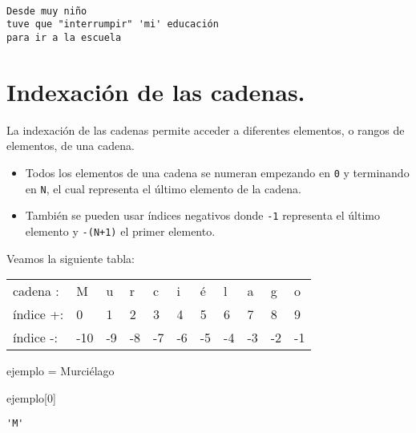 \documentclass[
  letterpaper,
  DIV=11,
  numbers=noendperiod]{scrreprt}
\newenvironment{Shaded}{\begin{snugshade}}{\end{snugshade}}
\newcommand{\DecValTok}[1]{\textcolor[rgb]{0.68,0.00,0.00}{#1}}
\newcommand{\NormalTok}[1]{\textcolor[rgb]{0.00,0.23,0.31}{#1}}
\newcommand{\OperatorTok}[1]{\textcolor[rgb]{0.37,0.37,0.37}{#1}}
\newcommand{\StringTok}[1]{\textcolor[rgb]{0.13,0.47,0.30}{#1}}
\providecommand{\tightlist}{%
  \setlength{\itemsep}{0pt}\setlength{\parskip}{0pt}}\usepackage{longtable,booktabs,array}
\begin{document}
\begin{verbatim}

Desde muy niño
tuve que "interrumpir" 'mi' educación
para ir a la escuela
\end{verbatim}

\section{Indexación de las
cadenas.}\label{indexaciuxf3n-de-las-cadenas.}

La indexación de las cadenas permite acceder a diferentes elementos, o
rangos de elementos, de una cadena.

\begin{itemize}
\tightlist
\item
  Todos los elementos de una cadena se numeran empezando en \texttt{0} y
  terminando en \texttt{N}, el cual representa el último elemento de la
  cadena.
\item
  También se pueden usar índices negativos donde \texttt{-1} representa
  el último elemento y \texttt{-(N+1)} el primer elemento.
\end{itemize}

Veamos la siguiente tabla:

\begin{longtable}[]{@{}lllllllllll@{}}
\toprule\noalign{}
\endhead
\bottomrule\noalign{}
\endlastfoot
cadena : & M & u & r & c & i & é & l & a & g & o \\
índice +: & 0 & 1 & 2 & 3 & 4 & 5 & 6 & 7 & 8 & 9 \\
índice -: & -10 & -9 & -8 & -7 & -6 & -5 & -4 & -3 & -2 & -1 \\
\end{longtable}

\begin{Shaded}
\begin{Highlighting}[]
\NormalTok{ejemplo }\OperatorTok{=} \StringTok{\textquotesingle{}Murciélago\textquotesingle{}}
\end{Highlighting}
\end{Shaded}

\begin{Shaded}
\begin{Highlighting}[]
\NormalTok{ejemplo[}\DecValTok{0}\NormalTok{]}
\end{Highlighting}
\end{Shaded}

\begin{verbatim}
'M'
\end{verbatim}
\end{document}
